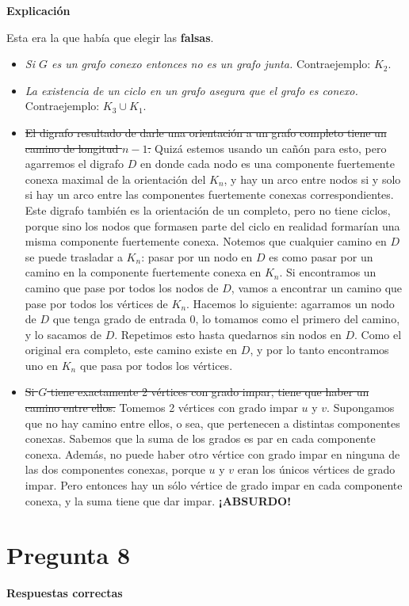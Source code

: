 \documentclass{article}
\begin{document}
\textbf{Explicación}

Esta era la que había que elegir las \textbf{falsas}.

\begin{itemize}
    \item \textit{Si $G$ es un grafo conexo entonces no es un grafo junta.} Contraejemplo: $K_2$.
    \item \textit{La existencia de un ciclo en un grafo asegura que el grafo es conexo.} Contraejemplo: $K_3 \cup K_1$.
    \item \sout{El digrafo resultado de darle una orientación a un grafo completo tiene un camino de longitud $n - 1$.} Quizá estemos usando un cañón para esto, pero agarremos el digrafo $D$ en donde cada nodo es una componente fuertemente conexa maximal de la orientación del $K_n$, y hay un arco entre nodos si y solo si hay un arco entre las componentes fuertemente conexas correspondientes. Este digrafo también es la orientación de un completo, pero no tiene ciclos, porque sino los nodos que formasen parte del ciclo en realidad formarían una misma componente fuertemente conexa. Notemos que cualquier camino en $D$ se puede trasladar a $K_n$: pasar por un nodo en $D$ es como pasar por un camino en la componente fuertemente conexa en $K_n$. Si encontramos un camino que pase por todos los nodos de $D$, vamos a encontrar un camino que pase por todos los vértices de $K_n$. Hacemos lo siguiente: agarramos un nodo de $D$ que tenga grado de entrada 0, lo tomamos como el primero del camino, y lo sacamos de $D$. Repetimos esto hasta quedarnos sin nodos en $D$. Como el original era completo, este camino existe en $D$, y por lo tanto encontramos uno en $K_n$ que pasa por todos los vértices.
    \item \sout{Si $G$ tiene exactamente 2 vértices con grado impar, tiene que haber un camino entre ellos.} Tomemos 2 vértices con grado impar $u$ y $v$. Supongamos que no hay camino entre ellos, o sea, que pertenecen a distintas componentes conexas. Sabemos que la suma de los grados es par en cada componente conexa. Además, no puede haber otro vértice con grado impar en ninguna de las dos componentes conexas, porque $u$ y $v$ eran los únicos vértices de grado impar. Pero entonces hay un sólo vértice de grado impar en cada componente conexa, y la suma tiene que dar impar. \textbf{¡ABSURDO!}
\end{itemize}

\section*{Pregunta 8}
\textbf{Respuestas correctas}
\end{document}
